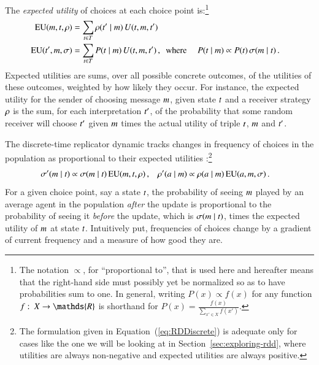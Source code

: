 \documentclass[fleqn,reqno,10pt]{article}
\renewcommand{\Pr}{\ensuremath{P}}
\begin{document}
The \emph{expected utility} of choices at each choice point is:\footnote{The notation
  $\propto$, for ``proportional to'', that is used here and hereafter means that the right-hand
  side must possibly yet be normalized so as to have probabilities sum to one. In general,
  writing $P(x) \propto f(x)$ for any function $f \mycolon X \rightarrow \mathds{R}$ is
  shorthand for $P(x) = \frac{f(x)}{\sum_{x' \in X} f(x')}$. }
\begin{align*}
  \EU(\messg, \state, \Rstrat) & = \sum_{\state \in \States}
  \Rstrat(\state' \probbar \messg) \myts U(\state, \messg, \state') \\
  \EU(\state', \messg, \Sstrat) & = \sum_{\state \in
    \States} P(\state \probbar \messg)  \myts
  U(\state, \messg, \state')\,, \text{\ \  where } &
P(\state \probbar \messg) & \propto \Pr(\state) \myts \Sstrat(\messg \probbar \state) \,.
\end{align*}
Expected utilities are sums, over all possible concrete outcomes, of the utilities of these
outcomes, weighted by how likely they occur. For instance, the expected utility for the sender
of choosing message $m$, given state $t$ and a receiver strategy $\rho$ is the
sum, for each interpretation $t'$, of the probability that some random receiver will
choose $t'$ given $m$ times the actual utility of triple $t$, $m$ and
$t'$.

The discrete-time replicator dynamic tracks changes in frequency of choices in the population
as proportional to their expected utilities
\citep[e.g.][]{HofbauerSigmund1998:Evolutionary-Ga}:\footnote{The formulation given in
  Equation~(\ref{eq:RDDiscrete}) is adequate only for cases like the one we will be looking at
  in Section~\ref{sec:exploring-rdd}, where utilities are always non-negative and expected
  utilities are always positive.}
\begin{align}
  \label{eq:RDDiscrete}
  \sigma'(m \mid t) & \propto \sigma(m \mid t) \thinspace
    \mathrm{EU}(m, t,\rho)\,, & \rho'(a \mid m) & \propto \rho(a \mid m) \thinspace
    \mathrm{EU}(a, m,\sigma)\,.   
\end{align}
For a given choice point, say a state $t$, the probability of seeing $m$ played by an
average agent in the population \emph{after} the update is proportional to the probability of
seeing it \emph{before} the update, which is $\sigma(m \mid t)$, times the
expected utility of $m$ at state $t$. Intuitively put, frequencies of choices change
by a gradient of current frequency and a measure of how good they are.
\end{document}
